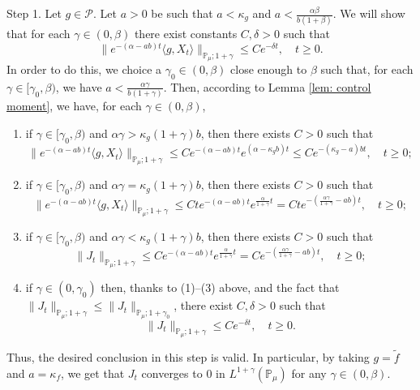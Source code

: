 \documentclass[12pt]{amsart}
\theoremstyle{plain}
\theoremstyle{definition}
\numberwithin{equation}{section}
\begin{document}
	Step 1. Let $g\in \mathcal P$. 
	Let $a > 0$ be such that $a< \kappa_g$ and $a < \frac{\alpha \beta}{b(1+\beta)}$. 
	We will show that for each $\gamma\in (0,\beta)$ there exist constants $C,\delta > 0$ such that
\[
	\|e^{-(\alpha - ab)t} \langle g, X_t\rangle\|_{\mathbb P_\mu;1+\gamma} 
	\leq C e^{-\delta t},
	\quad t\geq 0.
\] 
	In order to do this, we choice a $\gamma_0 \in (0,\beta)$ close enough to $\beta$ such that, for each $\gamma \in [\gamma_0, \beta)$, we have $a < \frac{\alpha\gamma}{b(1+\gamma)}$.
	Then, according to Lemma \ref{lem: control moment}, we have, for each $\gamma \in (0,\beta)$,
\begin{enumerate}
\item 
	if $\gamma \in [\gamma_0, \beta)$ and $\alpha\gamma> \kappa_g (1+\gamma)b$, then there exists $C>0$ such that
\[
    \|e^{-(\alpha - ab)t} \langle g, X_t\rangle\|_{\mathbb P_\mu;1+\gamma}
    \leq C e^{-(\alpha-ab)t}e^{(\alpha-\kappa_g b)t}
    \leq C  e^{-(\kappa_g - a)bt},
    \quad t\geq 0;
\]
\item 
	if $\gamma \in [\gamma_0, \beta)$ and $\alpha\gamma=\kappa_g(1+\gamma)b$, then there exists $C>0$ such that
\[
     \|e^{-(\alpha - ab)t} \langle g, X_t\rangle\|_{\mathbb P_\mu;1+\gamma}
     \leq C t e^{-(\alpha - a b)t}e^{\frac{\alpha}{1+\gamma}t}
     = C t e^{-(\frac{\alpha \gamma}{1+\gamma} - ab)t},
     \quad t\geq 0;
\]
\item 
	if $\gamma \in [\gamma_0, \beta)$ and $\alpha\gamma < \kappa_g (1+\gamma)b$, then there exists $C>0$ such that
\[
    \|J_t\|_{\mathbb{P}_{\mu};1+\gamma}
    \leq C  e^{-(\alpha - a b)t}e^{\frac{\alpha}{1+\gamma}t}
     = C  e^{-(\frac{\alpha \gamma}{1+\gamma} - ab)t},
     \quad t\geq 0;
\]
\item
	if $\gamma \in (0,\gamma_0)$ then, thanks to (1)--(3) above, and the fact that $\|J_t\|_{\mathbb{P}_{\mu};1+\gamma} 
	\leq \|J_t\|_{\mathbb{P}_{\mu};1+\gamma_0}$, there exist $C, \delta >0$ such that
\[
	\|J_t\|_{\mathbb{P}_{\mu};1+\gamma} 
	\leq Ce^{-\delta t},
	\quad t\geq 0.
\]
\end{enumerate}
	Thus, the desired conclusion in this step is valid. 
	In particular, by taking $g = \tilde f$ and $a = \kappa_f$, we get that $J_t$ converges to $0$ in $L^{1+\gamma}(\mathbb{P}_{\mu})$ for any $\gamma\in(0,\beta)$.
\end{document}
